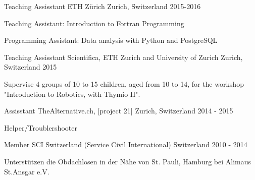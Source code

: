 

\begin{cventries}
	
\cventry
	{Teaching Assisstant} %
	{ETH Zürich} %
	{Zurich, Switzerland} %
	{2015-2016} %
	{
		\begin{cvitems} %
			\item {Teaching Assistant: Introduction to Fortran Programming}
			\item {Programming Assistant: Data analysis with Python and PostgreSQL}
		\end{cvitems}
	}

\cventry
    {Teaching Assisstant} %
    {Scientifica, ETH Zurich and University of Zurich} %
    {Zurich, Switzerland} %
    {2015} %
    {
      \begin{cvitems} %
        \item {Supervise 4 groups of 10 to 15 children, aged from 10 to 14, for the workshop "Introduction to Robotics, with Thymio II".}
      \end{cvitems}
    }

\cventry
    {Assisstant} %
    {TheAlternative.ch, [project 21]} %
    {Zurich, Switzerland} %
    {2014 - 2015} %
    {
      \begin{cvitems} %
        \item {Helper/Troublershooter}
      \end{cvitems}
    }


\cventry
{Member} %
{SCI Switzerland (Service Civil International)} %
{Switzerland} %
{2010 - 2014} %
{
	\begin{cvitems} %
		\item {Unterstützen die Obdachlosen in der Nähe von St. Pauli, Hamburg bei Alimaus St.Ansgar e.V.}
	\end{cvitems}
}



\end{cventries}
